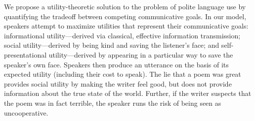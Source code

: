 \documentclass[9pt,twocolumn,twoside,lineno]{main_class_file}
\begin{document}
We propose a utility-theoretic solution to the problem of polite language use by quantifying the tradeoff between
competing communicative goals.
In our model, speakers attempt to maximize utilities that represent their communicative goals:
informational utility---derived via classical, effective
information transmission; social utility---derived by being kind and
saving the listener's face; and self-presentational utility---derived
by appearing in a particular way to save the speaker's own face.
Speakers then produce an utterance on the basis of
its expected utility (including their cost to speak).
The lie that a poem was great provides social utility by making the writer feel good, but does not provide information about the true state of the world.
Further, if the writer suspects that the poem was in fact terrible, the speaker runs the risk of being seen as uncooperative.


%
%
\end{document}
